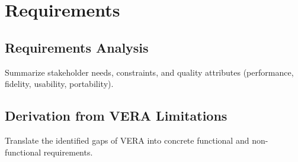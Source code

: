\chapter{Requirements} \label{chap:requirements}

\section{Requirements Analysis}
Summarize stakeholder needs, constraints, and quality attributes (performance, fidelity, usability, portability).

\section{Derivation from VERA Limitations}
Translate the identified gaps of VERA into concrete functional and non-functional requirements.
